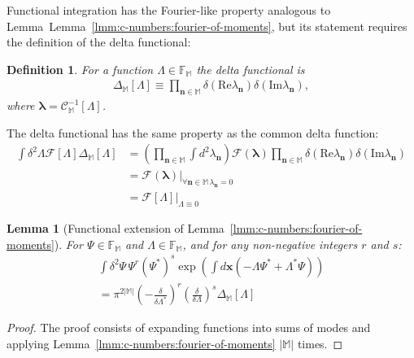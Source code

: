 \documentclass[12pt,aip,jmp,amssymb,amsmath]{revtex4-1}
\newtheorem{definition}{Definition}
\newtheorem{lemma}{Lemma}
\begin{document}
Functional integration has the Fourier-like property analogous to Lemma~Lemma~\ref{lmm:c-numbers:fourier-of-moments}, but its statement requires the definition of the delta functional:

\begin{definition}
\label{def:func-calculus:delta-functional}
    For a function $\Lambda \in \mathbb{F}_{\mathbb{M}}$ the delta functional is
    \begin{eqnarray*}
        \Delta_{\mathbb{M}}[\Lambda]
        \equiv \prod_{\boldsymbol{n} \in \mathbb{M}} \delta(\mathrm{Re} \lambda_{\boldsymbol{n}}) \delta(\mathrm{Im} \lambda_{\boldsymbol{n}}),
    \end{eqnarray*}
    where $\boldsymbol{\lambda} = \mathcal{C}_{\mathbb{M}}^{-1}[\Lambda]$.
\end{definition}

The delta functional has the same property as the common delta function:
\begin{eqnarray}
    \int \delta^2 \Lambda \mathcal{F}[\Lambda] \Delta_{\mathbb{M}}[\Lambda]
    & = \left(
            \prod_{\boldsymbol{n} \in \mathbb{M}} \int d^2\lambda_{\boldsymbol{n}}
        \right)
        \mathcal{F}(\boldsymbol{\lambda})
        \prod_{\boldsymbol{n} \in \mathbb{M}} \delta(\mathrm{Re} \lambda_{\boldsymbol{n}}) \delta(\mathrm{Im} \lambda_{\boldsymbol{n}}) \\
    & = \left. \mathcal{F}(\boldsymbol{\lambda}) \right|_{\forall \boldsymbol{n} \in \mathbb{M}\, \lambda_{\boldsymbol{n}} = 0} \\
    & = \left. \mathcal{F}[\Lambda] \right|_{\Lambda \equiv 0}
\end{eqnarray}

\begin{lemma}[Functional extension of Lemma~\ref{lmm:c-numbers:fourier-of-moments}]
\label{lmm:func-calculus:fourier-of-moments}
    For $\Psi \in \mathbb{F}_{\mathbb{M}}$ and $\Lambda \in \mathbb{F}_{\mathbb{M}}$, and for any non-negative integers $r$ and $s$:
    \begin{eqnarray*}
        \int \delta^2\Psi\, \Psi^r (\Psi^*)^s \exp \left(
                \int d\boldsymbol{x} \left( -\Lambda \Psi^* + \Lambda^* \Psi \right)
            \right) \\
        = \pi^{2|\mathbb{M}|}
            \left( -\frac{\delta}{\delta \Lambda^*} \right)^r
            \left( \frac{\delta}{\delta \Lambda} \right)^s
            \Delta_{\mathbb{M}}[\Lambda]
    \end{eqnarray*}
\end{lemma}
\begin{proof}
The proof consists of expanding functions into sums of modes and applying Lemma~\ref{lmm:c-numbers:fourier-of-moments} $|\mathbb{M}|$ times.
\end{proof}
\end{document}
